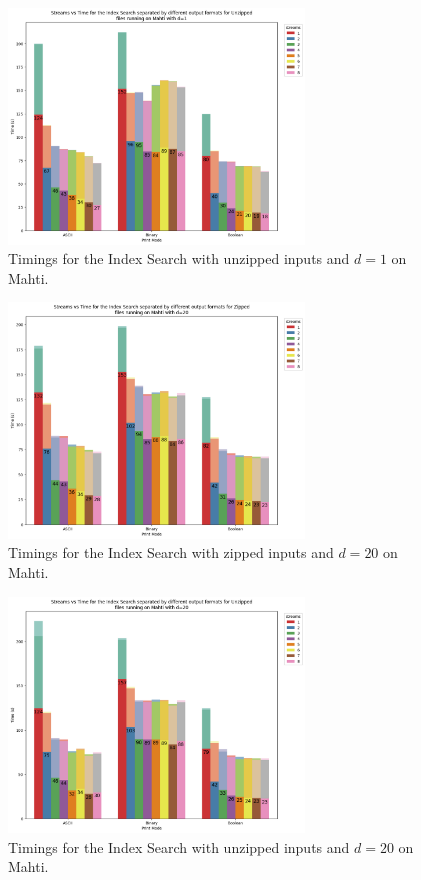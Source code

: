 \begin{figure}[t]
  \centering
  \includegraphics[width=0.7\textwidth]{images/MahtiIndexUnzippedD1.png}
  \caption{Timings for the Index Search with unzipped inputs and $d=1$ on Mahti.}\label{fig:MahtiIndexUnzippedD1}
\end{figure}

\begin{figure}[t]
  \centering
  \includegraphics[width=0.7\textwidth]{images/MahtiIndexZippedD20.png}
  \caption{Timings for the Index Search with zipped inputs and $d=20$ on Mahti.}\label{fig:MahtiIndexZippedD20}
\end{figure}

\begin{figure}[t]
  \centering
  \includegraphics[width=0.7\textwidth]{images/MahtiIndexUnzippedD20.png}
  \caption{Timings for the Index Search with unzipped inputs and $d=20$ on Mahti.}\label{fig:MahtiIndexUnzippedD20}
\end{figure}

